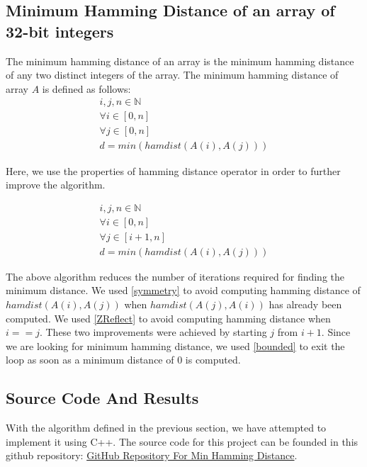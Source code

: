 \subsection{Minimum Hamming Distance of an array of 32-bit integers}
The minimum hamming distance of an array is the minimum hamming distance of any two distinct integers of the array. The minimum hamming distance of array $A$ is defined as follows:
\begin{equation}\label{HammingDistArray}
	\begin{gathered}
         i, j, n \in \mathbb{N}\\
        \forall i \in \left[0, n\right]\\
        \forall j \in \left[0, n\right]\\
        d = min(hamdist(A(i), A(j)))
	\end{gathered}
\end{equation}

Here, we use the properties of hamming distance operator in order to further improve the algorithm.

\begin{equation}\label{HammingDistArrayOpt}
	\begin{gathered}
         i, j, n \in \mathbb{N}\\
        \forall i \in \left[0, n\right]\\
        \forall j \in \left[i+1, n\right]\\
        d = min(hamdist(A(i), A(j)))
	\end{gathered}
\end{equation}

The above algorithm reduces the number of iterations required for finding the minimum distance. We used \ref{symmetry} to avoid computing hamming distance of $hamdist(A(i), A(j))$ when $hamdist(A(j), A(i))$ has already been computed. We used \ref{ZReflect} to avoid computing hamming distance when $i==j$. These two improvements were achieved by starting $j$ from $i+1$. Since we are looking for minimum hamming distance, we used \ref{bounded} to exit the loop as soon as a minimum distance of 0 is computed. 

\subsection{Source Code And Results}
With the algorithm defined in the previous section, we have attempted to implement it using C++. The source code for this project can be founded in this github repository: \href{https://github.com/hossein1387/random_sw_experiments/tree/master/hamming_distance}{GitHub Repository For Min Hamming Distance}. 
